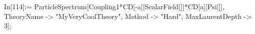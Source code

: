 In[114]:= ParticleSpectrum[Coupling1*CD[-a][ScalarField[]]*CD[a][Psi[]], TheoryName -> "MyVeryCoolTheory", Method -> "Hard", MaxLaurentDepth -> 3]; 